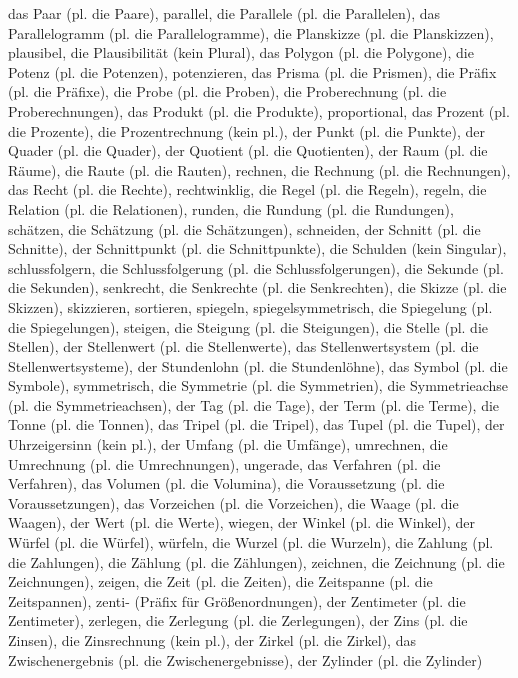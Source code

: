 das Paar (pl. die Paare),
parallel,
die Parallele (pl. die Parallelen),
das Parallelogramm (pl. die Parallelogramme),
die Planskizze (pl. die Planskizzen),
plausibel,
die Plausibilität (kein Plural),
das Polygon (pl. die Polygone),
die Potenz (pl. die Potenzen),
potenzieren,
das Prisma (pl. die Prismen),
die Präfix (pl. die Präfixe),
die Probe (pl. die Proben),
die Proberechnung (pl. die Proberechnungen),
das Produkt (pl. die Produkte),
proportional,
das Prozent (pl. die Prozente),
die Prozentrechnung (kein pl.),
der Punkt (pl. die Punkte),
der Quader (pl. die Quader),
der Quotient (pl. die Quotienten),
der Raum (pl. die Räume),
die Raute (pl. die Rauten),
rechnen,
die Rechnung (pl. die Rechnungen),
das Recht (pl. die Rechte),
rechtwinklig,
die Regel (pl. die Regeln),
regeln,
die Relation (pl. die Relationen),
runden,
die Rundung (pl. die Rundungen),
schätzen,
die Schätzung (pl. die Schätzungen),
schneiden,
der Schnitt (pl. die Schnitte),
der Schnittpunkt (pl. die Schnittpunkte),
die Schulden (kein Singular),
schlussfolgern,
die Schlussfolgerung (pl. die Schlussfolgerungen),
die Sekunde (pl. die Sekunden),
senkrecht,
die Senkrechte (pl. die Senkrechten),
die Skizze (pl. die Skizzen),
skizzieren,
sortieren,
spiegeln,
spiegelsymmetrisch,
die Spiegelung (pl. die Spiegelungen),
steigen,
die Steigung (pl. die Steigungen),
die Stelle (pl. die Stellen),
der Stellenwert (pl. die Stellenwerte),
das Stellenwertsystem (pl. die Stellenwertsysteme),
der Stundenlohn (pl. die Stundenlöhne),
das Symbol (pl. die Symbole),
symmetrisch,
die Symmetrie (pl. die Symmetrien),
die Symmetrieachse (pl. die Symmetrieachsen),
der Tag (pl. die Tage),
der Term (pl. die Terme),
die Tonne (pl. die Tonnen),
das Tripel (pl. die Tripel),
das Tupel (pl. die Tupel),
der Uhrzeigersinn (kein pl.),
der Umfang (pl. die Umfänge),
umrechnen,
die Umrechnung (pl. die Umrechnungen),
ungerade,
das Verfahren (pl. die Verfahren),
das Volumen (pl. die Volumina),
die Voraussetzung (pl. die Voraussetzungen),
das Vorzeichen (pl. die Vorzeichen),
die Waage (pl. die Waagen),
der Wert (pl. die Werte),
wiegen,
der Winkel (pl. die Winkel),
der Würfel (pl. die Würfel),
würfeln,
die Wurzel (pl. die Wurzeln),
die Zahlung (pl. die Zahlungen),
die Zählung (pl. die Zählungen),
zeichnen,
die Zeichnung (pl. die Zeichnungen),
zeigen,
die Zeit (pl. die Zeiten),
die Zeitspanne (pl. die Zeitspannen),
zenti- (Präfix für Größenordnungen),
der Zentimeter (pl. die Zentimeter),
zerlegen,
die Zerlegung (pl. die Zerlegungen),
der Zins (pl. die Zinsen),
die Zinsrechnung (kein pl.),
der Zirkel (pl. die Zirkel),
das Zwischenergebnis (pl. die Zwischenergebnisse),
der Zylinder (pl. die Zylinder) 